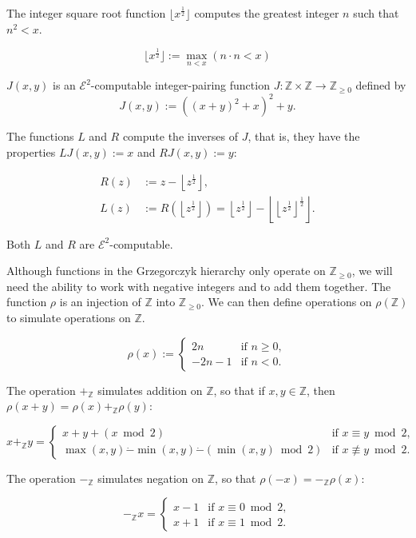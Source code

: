 \documentclass[a4paper]{article}
\newcommand{\grz}[1]{$\mathcal{E}^{#1}$}	%
\newcommand{\ZZ}{\mathbb{Z}}
\newcommand{\Zpos}{\mathbb{Z}_{\geq 0}}
\newcommand{\psub}{\dot -}	%
\theoremstyle{plain}
\theoremstyle{definition}
\begin{document}
The integer square root function $\lfloor x^{\frac{1}{2}} \rfloor$ computes the greatest integer $n$ such that $n^2 < x$.

\[ \lfloor x^{\frac{1}{2}} \rfloor := \max_{n < x}{\left ( n \cdot n < x \right )} \]

$J(x,y)$ is an \grz{2}-computable integer-pairing function $J:\ZZ \times \ZZ \rightarrow \Zpos$ defined by 
\[J(x,y) := \left( (x+y)^2+x \right)^2+y. \]

The functions $L$ and $R$ compute the inverses of $J$, that is, they have the properties $LJ(x,y) := x$ and $RJ(x,y) := y$:

\begin{align}
	R(z) &:= z - \left\lfloor z^{\frac{1}{2}} \right\rfloor, \\
	L(z) &:= R \left( \left\lfloor z^{\frac{1}{2}} \right\rfloor \right) = \left\lfloor z^{\frac{1}{2}} \right\rfloor - \left \lfloor \left \lfloor z^{\frac{1}{2}} \right\rfloor^{\frac{1}{2}} \right \rfloor. 
\end{align}

Both $L$ and $R$ are \grz{2}-computable.

Although functions in the Grzegorczyk hierarchy only operate on $\Zpos$, we will need the ability to work with negative integers and to add them together.
The function $\rho$ is an injection of $\ZZ$ into $\Zpos$. We can then define operations on $\rho(\ZZ)$ to simulate operations on $\ZZ$.

\[ \rho(x) := \begin{cases}
		2n & \textrm{if } n \geq 0, \\
		-2n-1 & \textrm{if } n < 0.
	\end{cases}
\]

The operation $+_{\ZZ}$ simulates addition on $\ZZ$, so that if $x,y \in \ZZ$, then $\rho(x+y) = \rho(x) +_{\ZZ} \rho(y)$:

\[ x +_{\ZZ} y = \begin{cases}
		x + y + (x \bmod{2}) & \textrm{if } x \equiv y \bmod{2}, \\
		\max(x,y) \psub \min(x,y) \psub (\min(x,y) \bmod{2}) & \textrm{if } x \not \equiv y \bmod{2}.
	\end{cases}
\]

The operation $-_{\ZZ}$ simulates negation on $\ZZ$, so that $\rho(-x) = -_{\ZZ} \rho(x)$:

\[ -_{\ZZ} x = \begin{cases}
		x-1 & \textrm{if } x \equiv 0 \bmod{2}, \\
		x+1 & \textrm{if } x \equiv 1 \bmod{2}.
	\end{cases}
\]
\end{document}
